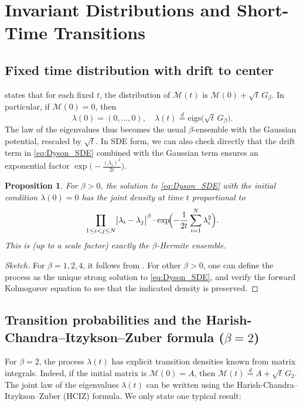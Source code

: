 \documentclass[letterpaper,11pt,oneside,reqno]{article}
\numberwithin{equation}{section}
\newtheorem{proposition}{Proposition}[section]
\theoremstyle{definition}
\begin{document}
\section{Invariant Distributions and Short-Time Transitions}
\label{sec:invariant_laws}

\subsection{Fixed time distribution with drift to center}
 states that for each fixed $t$, the distribution of $\mathcal{M}(t)$ is $\mathcal{M}(0) + \sqrt{t}\,G_\beta$. In particular, if $\mathcal{M}(0)=0$, then
\[
\lambda(0) = (0,\dots,0),\quad \lambda(t)\stackrel{d}{=} \text{eigs}\bigl(\sqrt{t}\,G_\beta\bigr).
\]
The law of the eigenvalues thus becomes the usual $\beta$-ensemble with the Gaussian potential, rescaled by $\sqrt{t}$. In SDE form, we can also check directly that the drift term in \eqref{eq:Dyson_SDE} combined with the Gaussian term ensures an exponential factor $\exp\bigl(-\frac{(\lambda_i)^2}{2t}\bigr)$.

\begin{proposition}
\label{prop:beta_invariant}
For $\beta>0$, the solution to \eqref{eq:Dyson_SDE} with the initial condition $\lambda(0)=0$ has the joint density at time $t$ proportional to
\[
\prod_{1\le i<j\le N}\bigl|\lambda_i-\lambda_j\bigr|^\beta \cdot \exp\!\Bigl(-\frac{1}{2t}\sum_{i=1}^N \lambda_i^2\Bigr).
\]
This is (up to a scale factor) exactly the $\beta$-Hermite ensemble.
\end{proposition}
\begin{proof}[Sketch]
For $\beta=1,2,4$, it follows from . For other $\beta>0$, one can define the process as the unique strong solution to \eqref{eq:Dyson_SDE}, and verify the forward Kolmogorov equation to see that the indicated density is preserved.
\end{proof}

\subsection{Transition probabilities and the Harish-Chandra--Itzykson--Zuber formula (\texorpdfstring{$\beta=2$}{beta=2})}
For $\beta=2$, the process $\lambda(t)$ has explicit transition densities known from matrix integrals. Indeed, if the initial matrix is $\mathcal{M}(0)=A$, then $\mathcal{M}(t)\stackrel{d}{=} A + \sqrt{t}\,G_2$. The joint law of the eigenvalues $\lambda(t)$ can be written using the Harish-Chandra--Itzykson--Zuber (HCIZ) formula. We only state one typical result:
\end{document}
